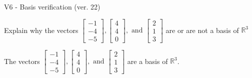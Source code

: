 \begin{exercise}
  \begin{exerciseTitle}V6 - Basis verification (ver. 22)\end{exerciseTitle}
  \begin{exerciseStatement}
    Explain why the vectors \(\left[\begin{array}{r}
-1 \\
-4 \\
-5
\end{array}\right] , \left[\begin{array}{r}
4 \\
4 \\
0
\end{array}\right] , \text{ and } \left[\begin{array}{r}
2 \\
1 \\
3
\end{array}\right]\) are or are not a basis of \(\mathbb{R}^3\)	


  \end{exerciseStatement}
  \begin{exerciseAnswer}
   The vectors \(\left[\begin{array}{r}
-1 \\
-4 \\
-5
\end{array}\right] , \left[\begin{array}{r}
4 \\
4 \\
0
\end{array}\right] , \text{ and } \left[\begin{array}{r}
2 \\
1 \\
3
\end{array}\right]\) 
  	 are  a basis of \(\mathbb{R}^3\).
  


  \end{exerciseAnswer}
\end{exercise}